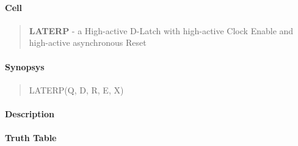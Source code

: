 \label{LATERP}
\paragraph{Cell}
\begin{quote}
    \textbf{LATERP} - a High-active D-Latch with high-active Clock Enable and high-active asynchronous Reset
\end{quote}

\paragraph{Synopsys}
\begin{quote}
    LATERP(Q, D, R, E, X)
\end{quote}

\paragraph{Description}

%

\paragraph{Truth Table}
%

